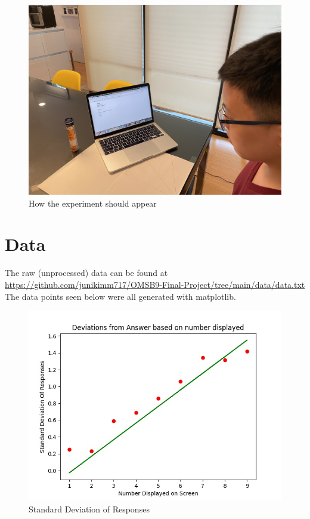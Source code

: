\documentclass[12pt]{article}
\begin{document}
\begin{figure}
\centering
\includegraphics[scale=0.3]{diagram.JPG}
\caption{How the experiment should appear}
\end{figure}

\section{Data}
The raw (unprocessed) data can be found at \\
\url{https://github.com/junikimm717/OMSB9-Final-Project/tree/main/data/data.txt}
The data points seen below were all generated with matplotlib.

\begin{figure} [p]
\centering
\includegraphics[scale=0.4]{regression.jpg}
\caption{Standard Deviation of Responses}
\end{figure}
\end{document}
